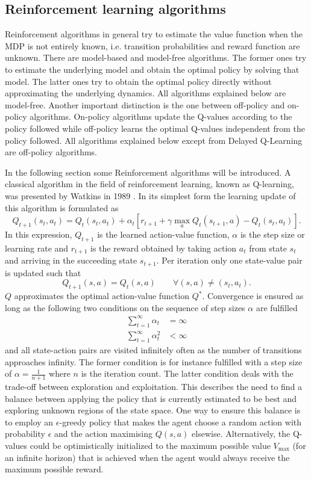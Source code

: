 \documentclass[../main.tex]{subfiles}
\begin{document}
\subsection{Reinforcement learning algorithms}
Reinforcement algorithms in general try to estimate the value function when the MDP is not entirely known, i.e. transition probabilities and reward function are unknown. There are model-based and model-free algorithms. The former ones try to estimate the underlying model and obtain the optimal policy by solving that model. The latter ones try to obtain the optimal policy directly without approximating the underlying dynamics. All algorithms explained below are model-free. Another important distinction is the one between off-policy and on-policy algorithms. On-policy algorithms update the Q-values according to the policy followed while off-policy learns the optimal Q-values independent from the policy followed. All algorithms explained below except from Delayed Q-Learning are off-policy algorithms.\par
In the following section some Reinforcement algorithms will be introduced. A classical algorithm in the field of reinforcement learning, known as Q-learning, was presented by Watkins in 1989 \cite{watkins1992q}. In its simplest form the learning update of this algorithm is formulated as
\begin{equation}
Q_{t+1}(s_t,a_t) = Q_{t}(s_t,a_t) + \alpha_t \left[ r_{t+1}+\gamma \max_a Q_{t}(s_{t+1},a) - Q_{t}(s_t,a_t)\right].
\end{equation}
In this expression, $Q_{t+1}$ is the learned action-value function, $\alpha$ is the step size or learning rate and $r_{t+1}$ is the reward obtained by taking action $a_t$ from state $s_t$ and arriving in the succeeding state $s_{t+1}$.
Per iteration only one state-value pair is updated such that
\begin{equation}
    Q_{t+1}(s,a) = Q_{t}(s,a) \qquad \forall (s,a) \neq (s_t,a_t).
\end{equation}
$Q$ approximates the optimal action-value function $Q^*$. Convergence is ensured as long as the following two conditions on the sequence of step sizes $\alpha$ are fulfilled \cite{jaakkola1994convergence}
\begin{align}\label{eq:stepsize}
    \sum_{t=1}^\infty \alpha_t &= \infty\\
    \sum_{t=1}^\infty \alpha_t^2 &< \infty   
\end{align}
and all state-action pairs are visited infinitely often as the number of transitions approaches infinity. The former condition is for instance fulfilled with a step size of $\alpha = \frac{1}{n+1}$ where $n$ is the iteration count. The latter condition deals with the trade-off between exploration and exploitation. This describes the need to find a balance between applying the policy that is currently estimated to be best and exploring unknown regions of the state space. One way to ensure this balance is to employ an $\epsilon$-greedy policy that makes the agent choose a random action with probability $\epsilon$ and the action maximising $Q(s,a)$ elsewise. Alternatively, the Q-values could be optimistically initialized to the maximum possible value $V_{\max}$ (for an infinite horizon) that is achieved when the agent would always receive the maximum possible reward. 
\end{document}
